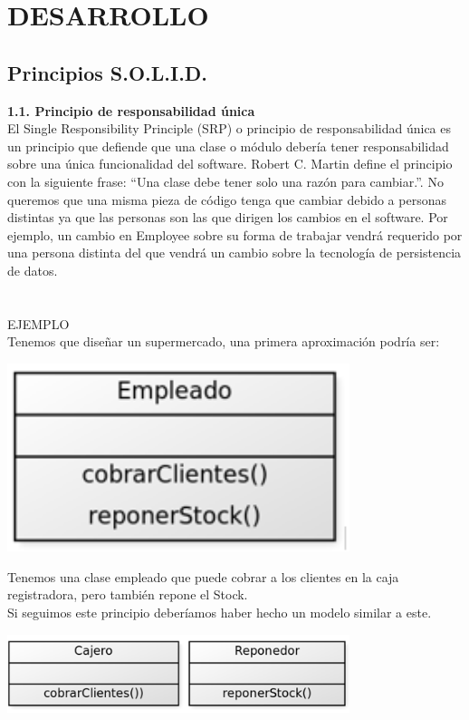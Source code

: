 \documentclass[11pt,letterpaper]{article}
\begin{document}
\section{DESARROLLO}


\subsection{Principios S.O.L.I.D.} 

\textbf{ 1.1. Principio de responsabilidad única } 
\\El Single Responsibility Principle (SRP) o principio de responsabilidad única es un principio que defiende que una clase o módulo debería tener responsabilidad sobre una única funcionalidad del software.
Robert C. Martin define el principio con la siguiente frase: “Una clase debe tener solo una razón para cambiar.”. No queremos que una misma pieza de código tenga que cambiar debido a personas distintas ya que las personas son las que dirigen los cambios en el software. Por ejemplo, un cambio en Employee sobre su forma de trabajar vendrá requerido por una persona distinta del que vendrá un cambio sobre la tecnología de persistencia de datos.\\\\\\
EJEMPLO\\
Tenemos que diseñar un supermercado, una primera aproximación podría ser:\\
\begin{center}
	\includegraphics[width=10cm]{./imagenes/1.png} 
\end{center}
Tenemos una clase empleado que puede cobrar a los clientes en la caja registradora, pero también repone el Stock.\\
Si seguimos este principio deberíamos haber hecho un modelo similar a este.\\
\begin{center}
	\includegraphics[width=10cm]{./imagenes/2.png} 
\end{center}
\end{document}
